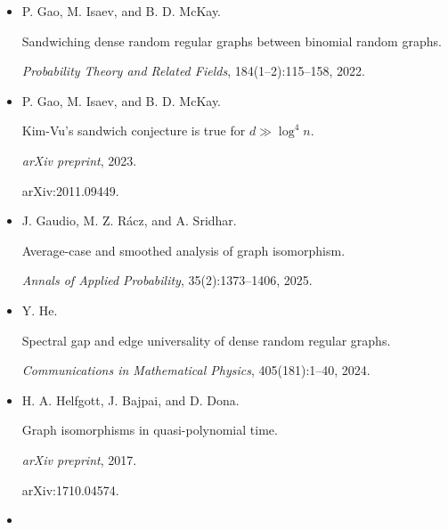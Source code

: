 \begin{itemize}
In \emph{Proceedings of the Fourteenth Annual ACM-SIAM Symposium on
Discrete Algorithms (SODA’20)}, pages 690–701, 2020.





\item[] 
[23]

P. Gao, M. Isaev, and B. D. McKay.


Sandwiching dense random regular graphs between binomial random
graphs.


\emph{Probability Theory and Related Fields}, 184(1–2):115–158,
2022.





\item[] 
[24]

P. Gao, M. Isaev, and B. D. McKay.


Kim-Vu’s sandwich conjecture is true for $d\gg\log^{4}n$.


\emph{arXiv preprint}, 2023.


arXiv:2011.09449.





\item[] 
[25]

J. Gaudio, M. Z. Rácz, and A. Sridhar.


Average-case and smoothed analysis of graph isomorphism.


\emph{Annals of Applied Probability}, 35(2):1373–1406, 2025.





\item[] 
[26]

Y. He.


Spectral gap and edge universality of dense random regular graphs.


\emph{Communications in Mathematical Physics}, 405(181):1–40, 2024.





\item[] 
[27]

H. A. Helfgott, J. Bajpai, and D. Dona.


Graph isomorphisms in quasi-polynomial time.


\emph{arXiv preprint}, 2017.


arXiv:1710.04574.





\item[] 
[28]


\end{itemize}
